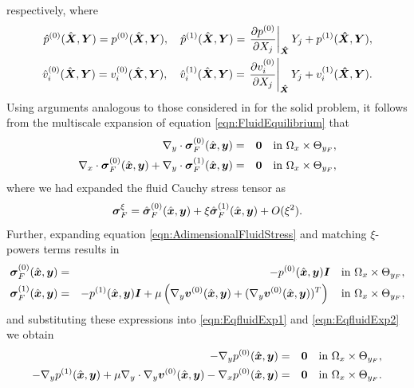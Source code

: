 \documentclass[preprint,3p,12pt,number,sort&compress]{elsarticle}
\newcommand{\pd}[2]{\frac{\partial #1}{ \partial #2}}   %
\def\vec   #1{\text{\boldmath $#1$}{}}
\def\ten   #1{\text{\boldmath $#1$}{}}
\begin{document}
respectively, where
\begin{align}
	\hat p^{(0)} (\hat{\vec X}, \vec Y) = 	p^{(0)} (\hat{\vec X}, \vec Y), \quad 	\hat p^{(1)} (\hat{\vec X}, \vec Y) =  \left. \pd{p^{(0)}}{X_j}   \right|_{\vec{\hat X}} Y_j + p^{(1)}(\vec {\hat X}, \vec Y),\\
	\hat v_i^{(0)} (\hat{\vec X}, \vec Y) = 	v_i^{(0)} ( \hat{\vec X}, \vec Y), \quad 	\hat v_i^{(1)} (\hat{\vec X}, \vec Y) =  \left. \pd{v_i^{(0)}}{X_j}   \right|_{\vec{\hat X}} Y_j + v_i^{(1)}(\vec {\hat X}, \vec Y). 
\end{align}
Using arguments analogous to those considered in for the solid problem, it follows from the multiscale expansion of equation \eqref{eqn:FluidEquilibrium} that
\begin{eqnarray}
	\nabla_y \cdot \ten{\sigma}_F^{(0)}(\hat{\vec x}, \vec y) &=& \vec 0 \quad \mbox{in $\Omega_x \times \Theta_{y_F }$}  \label{eqn:EqfluidExp1},  \\
	\nabla_x \cdot \ten{\sigma}_F^{(0)} (\hat{\vec x}, \vec y)  + \nabla_y \cdot \ten{\sigma}_F^{(1)}(\hat{\vec x}, \vec y)&=& \vec 0    \label{eqn:EqfluidExp2} \quad \mbox{in $\Omega_x \times\Theta_{y_F}$},
\end{eqnarray}
where we had expanded the fluid Cauchy stress tensor as 
\begin{equation}
\ten{\sigma}_F^{\xi}=\hat{\ten{\sigma}}_F^{(0)}(\hat{\vec x}, \vec y)+\xi \hat{\ten{\sigma}}_F^{(1)}(\hat{\vec x}, \vec y)+O(\xi^2). \label{eqn:sigmaFexpansion}
\end{equation}
Further, expanding equation \eqref{eqn:AdimensionalFluidStress} and matching $\xi$-powers terms  results in
\begin{eqnarray}
	\ten \sigma_F^{(0)} (\hat{\vec x}, \vec y) &=& -p^{(0)} (\hat{\vec x}, \vec y) \ten I	\quad \mbox{in } \Omega_x \times \Theta_{y_F} \label{zero_stress_fluid_fine}, \\
	\ten \sigma_F^{(1)}(\hat{\vec x}, \vec y) &=& -p^{(1)} (\hat{\vec x}, \vec y) \ten I + \mu \left(  \nabla_y \vec v^{(0)}(\hat{\vec x}, \vec y)  + (\nabla_y \vec v^{(0)}(\hat{\vec x}, \vec y) )^T \right) \quad \mbox{in } \Omega_x \times \Theta_{y_F},
\end{eqnarray}
and substituting these expressions into \eqref{eqn:EqfluidExp1} and \eqref{eqn:EqfluidExp2} we obtain
\begin{eqnarray}
	-\nabla_y p^{(0)}(\hat{\vec x}, \vec y) &=& \vec 0 \quad \mbox{in } \Omega_x \times\Theta_{y_F}, \label{eq:coarse_scale_pressure}\\
	- \nabla_y p^{(1)}(\hat{\vec x}, \vec y) +  {\mu} \nabla_y \cdot \nabla_y \vec v^{(0)}(\hat{\vec x}, \vec y)   - \nabla_x p^{(0)}(\hat{\vec x}, \vec y) & =& \vec 0 \quad \mbox{in } \Omega_x \times\Theta_{y_F}. \label{eq:fine_scale_fluid_equilibrium}
\end{eqnarray}
\end{document}
